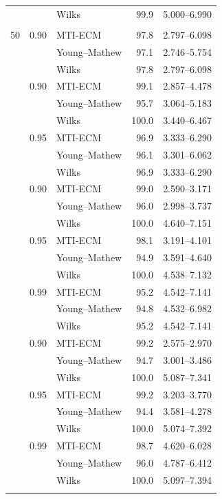 \begin{longtable}{@{}rrlrr@{}}
 &  & Wilks & 99.9 & 5.000--6.990 \\
\addlinespace[0.25em]
\multicolumn{5}{@{}l}{\textit{Beta(1,8)}}\\
50 & 0.90 & MTI-ECM & 97.8 & 2.797--6.098 \\
 &  & Young--Mathew & 97.1 & 2.746--5.754 \\
 &  & Wilks & 97.8 & 2.797--6.098 \\
\addlinespace[0.25em]
100 & 0.90 & MTI-ECM & 99.1 & 2.857--4.478 \\
 &  & Young--Mathew & 95.7 & 3.064--5.183 \\
 &  & Wilks & 100.0 & 3.440--6.467 \\
\addlinespace[0.25em]
100 & 0.95 & MTI-ECM & 96.9 & 3.333--6.290 \\
 &  & Young--Mathew & 96.1 & 3.301--6.062 \\
 &  & Wilks & 96.9 & 3.333--6.290 \\
\addlinespace[0.25em]
500 & 0.90 & MTI-ECM & 99.0 & 2.590--3.171 \\
 &  & Young--Mathew & 96.0 & 2.998--3.737 \\
 &  & Wilks & 100.0 & 4.640--7.151 \\
\addlinespace[0.25em]
500 & 0.95 & MTI-ECM & 98.1 & 3.191--4.101 \\
 &  & Young--Mathew & 94.9 & 3.591--4.640 \\
 &  & Wilks & 100.0 & 4.538--7.132 \\
\addlinespace[0.25em]
500 & 0.99 & MTI-ECM & 95.2 & 4.542--7.141 \\
 &  & Young--Mathew & 94.8 & 4.532--6.982 \\
 &  & Wilks & 95.2 & 4.542--7.141 \\
\addlinespace[0.25em]
1000 & 0.90 & MTI-ECM & 99.2 & 2.575--2.970 \\
 &  & Young--Mathew & 94.7 & 3.001--3.486 \\
 &  & Wilks & 100.0 & 5.087--7.341 \\
\addlinespace[0.25em]
1000 & 0.95 & MTI-ECM & 99.2 & 3.203--3.770 \\
 &  & Young--Mathew & 94.4 & 3.581--4.278 \\
 &  & Wilks & 100.0 & 5.074--7.392 \\
\addlinespace[0.25em]
1000 & 0.99 & MTI-ECM & 98.7 & 4.620--6.028 \\
 &  & Young--Mathew & 96.0 & 4.787--6.412 \\
 &  & Wilks & 100.0 & 5.097--7.394 \\
\addlinespace[0.25em]

\end{longtable}
